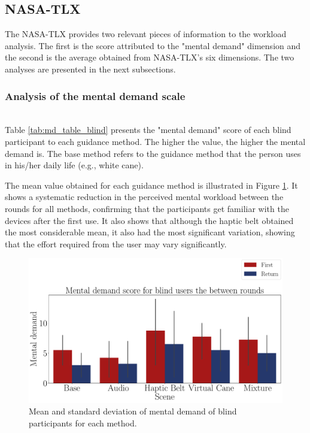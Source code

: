\subsection{NASA-TLX}
\label{subsubsec:results_nasa_tlx_1}

The NASA-TLX provides two relevant pieces of information to the workload analysis. The first is the score attributed to the "mental demand" dimension and the second is the average obtained from NASA-TLX's six dimensions. The two analyses are presented in the next subsections.

\subsubsection*{Analysis of the mental demand scale}\mbox{}\\

Table \ref{tab:md_table_blind} presents the "mental demand" score of each blind participant to each guidance method. The higher the value, the higher the mental demand is. The base method refers to the guidance method that the person uses in his/her daily life (e.g., white cane). 



The mean value obtained for each guidance method is illustrated in Figure \ref{fig:barplot_md_avg_5_scene_blind}. It shows a systematic reduction in the perceived mental workload between the rounds for all methods, confirming that the participants get familiar with the devices after the first use. It also shows that although the haptic belt obtained the most considerable mean, it also had the most significant variation, showing that the effort required from the user may vary significantly.

\begin{figure}[!htb]
    \centering
    \includegraphics[width = \textwidth]{Resultados/Nasa/Figuras/pdf/barplot_md_avg_5_scene_blind.pdf}
    \caption{Mean and standard deviation of mental demand of blind participants for each method.}
    \label{fig:barplot_md_avg_5_scene_blind}
\end{figure}


